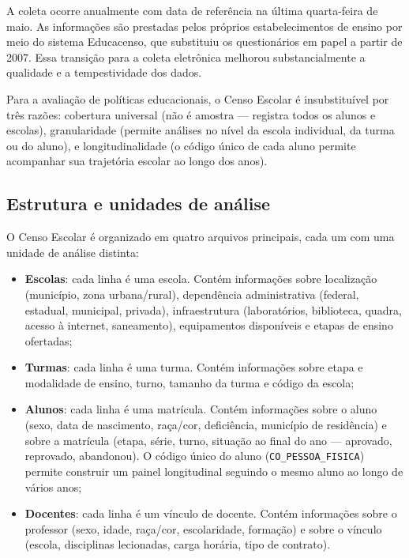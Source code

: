 A coleta ocorre anualmente com data de referência na última quarta-feira de maio. As informações são prestadas pelos próprios estabelecimentos de ensino por meio do sistema Educacenso, que substituiu os questionários em papel a partir de 2007. Essa transição para a coleta eletrônica melhorou substancialmente a qualidade e a tempestividade dos dados.

Para a avaliação de políticas educacionais, o Censo Escolar é insubstituível por três razões: cobertura universal (não é amostra — registra todos os alunos e escolas), granularidade (permite análises no nível da escola individual, da turma ou do aluno), e longitudinalidade (o código único de cada aluno permite acompanhar sua trajetória escolar ao longo dos anos).

\subsection{Estrutura e unidades de análise}

O Censo Escolar é organizado em quatro arquivos principais, cada um com uma unidade de análise distinta:

\begin{itemize}
  \item \textbf{Escolas}: cada linha é uma escola. Contém informações sobre localização (município, zona urbana/rural), dependência administrativa (federal, estadual, municipal, privada), infraestrutura (laboratórios, biblioteca, quadra, acesso à internet, saneamento), equipamentos disponíveis e etapas de ensino ofertadas;

  \item \textbf{Turmas}: cada linha é uma turma. Contém informações sobre etapa e modalidade de ensino, turno, tamanho da turma e código da escola;

  \item \textbf{Alunos}: cada linha é uma matrícula. Contém informações sobre o aluno (sexo, data de nascimento, raça/cor, deficiência, município de residência) e sobre a matrícula (etapa, série, turno, situação ao final do ano — aprovado, reprovado, abandonou). O código único do aluno (\texttt{CO\_PESSOA\_FISICA}) permite construir um painel longitudinal seguindo o mesmo aluno ao longo de vários anos;

  \item \textbf{Docentes}: cada linha é um vínculo de docente. Contém informações sobre o professor (sexo, idade, raça/cor, escolaridade, formação) e sobre o vínculo (escola, disciplinas lecionadas, carga horária, tipo de contrato).
\end{itemize}

